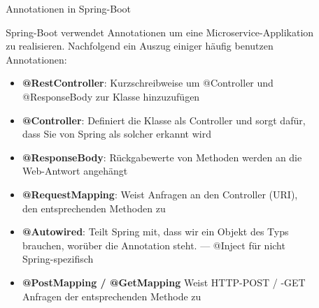\documentclass[final]{beamer}
\newlength{\sepwid}
\newlength{\onecolwid}
\newlength{\twocolwid}
\begin{document}
\begin{frame}
\begin{columns}[t]
\begin{column}{\twocolwid}
\begin{columns}[t,totalwidth=\twocolwid]
\begin{column}{\onecolwid}



\end{column} %
\begin{column}{\sepwid}\end{column} %

\begin{column}{\onecolwid} %


\end{column} %

\end{columns} %

\end{column} %

\begin{column}{\sepwid}\end{column} %

\begin{column}{\onecolwid} %


\begin{block}{Annotationen in Spring-Boot}

Spring-Boot verwendet Annotationen um eine Microservice-Applikation zu realisieren. Nachfolgend ein Auszug einiger häufig benutzen Annotationen:

\begin{itemize}
	\item \textcolor{ui-red}{\textbf{@RestController}}: Kurzschreibweise um \textcolor{ui-red}{@Controller} und \textcolor{ui-red}{@ResponseBody} zur Klasse hinzuzufügen 
	\item \textcolor{ui-red}{\textbf{@Controller}}: Definiert die Klasse als Controller und sorgt dafür, dass Sie von Spring als solcher erkannt wird
	\item \textcolor{ui-red}{\textbf{@ResponseBody}}: Rückgabewerte von Methoden werden an die Web-Antwort angehängt
	\item \textcolor{ui-red}{\textbf{@RequestMapping}}: Weist Anfragen an den Controller (URI), den entsprechenden Methoden zu
	\item \textcolor{ui-red}{\textbf{@Autowired}}: Teilt Spring mit, dass wir ein Objekt des Typs brauchen, worüber die Annotation steht. --- \textcolor{ui-red}{@Inject} für nicht Spring-spezifisch
\item \textcolor{ui-red}{\textbf{@PostMapping / @GetMapping}}
Weist HTTP-POST / -GET Anfragen der entsprechenden Methode zu


\end{itemize}
\end{block}
\end{column}
\end{columns}
\end{frame}
\end{document}
